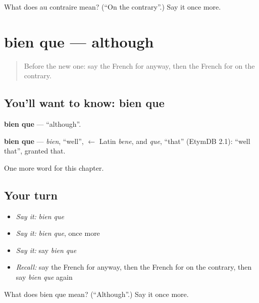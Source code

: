 \begin{tcolorbox}[breakable,colback=teal!4,colframe=teal!35!black,title={Before you move on}]
What does au contraire mean? (\textquotedblleft{}On the contrary\textquotedblright{}.) Say it once more.
\end{tcolorbox}
\section[bien que]{bien que — although}

\label{lesson:FR-C158-bien-que}



\begin{quote}
Before the new one: say the French for anyway, then the French for on the contrary.
\end{quote}

\subsection*{You'll want to know: bien que}
\textbf{bien que} — \textquotedblleft{}although\textquotedblright{}.

\begin{cousinweb}
\textbf{bien que} — \emph{bien}, \textquotedblleft{}well\textquotedblright{}, $\leftarrow$ Latin \emph{bene}, and \emph{que}, \textquotedblleft{}that\textquotedblright{} (EtymDB 2.1): \textquotedblleft{}well that\textquotedblright{}, granted that.
\end{cousinweb}

\begin{grammarlens}[title={What you've built}]
One more word for this chapter.
\end{grammarlens}

\subsection*{Your turn}
\begin{itemize}
\raggedright
  \item \emph{Say it:} \emph{bien que}
  \item \emph{Say it:} \emph{bien que}, once more
  \item \emph{Say it:} say \emph{bien que}
  \item \emph{Recall:} say the French for anyway, then the French for on the contrary, then say \emph{bien que} again
\end{itemize}

\begin{tcolorbox}[breakable,colback=teal!4,colframe=teal!35!black,title={Before you move on}]
What does bien que mean? (\textquotedblleft{}Although\textquotedblright{}.) Say it once more.
\end{tcolorbox}
